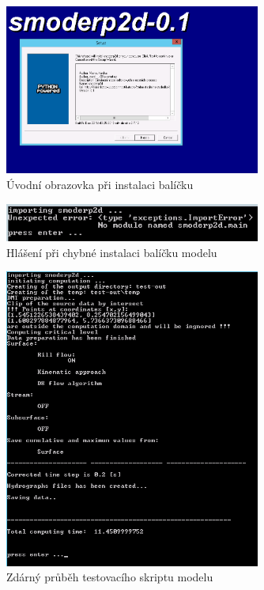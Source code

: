  \begin{figure}[t!]
    \centering
    \includegraphics[width=0.75\textwidth]{./img/instalace.png}
    \caption{Úvodní obrazovka při instalaci balíčku \smod}
    \label{fig:pruvodce}
  \end{figure}
% 
  \begin{figure}[b!]
    \centering
    \includegraphics[width=0.75\textwidth]{./img/importerror.png}
    \caption{Hlášení při chybné instalaci balíčku modelu \smod}
    \label{fig:importerror}
  \end{figure}
% 
  \begin{figure}[t!]
    \centering
    \includegraphics[width=0.75\textwidth]{./img/testok.png}
    \caption{Zdárný průběh testovacího skriptu modelu}
    \label{fig:testok}
  \end{figure}
  
